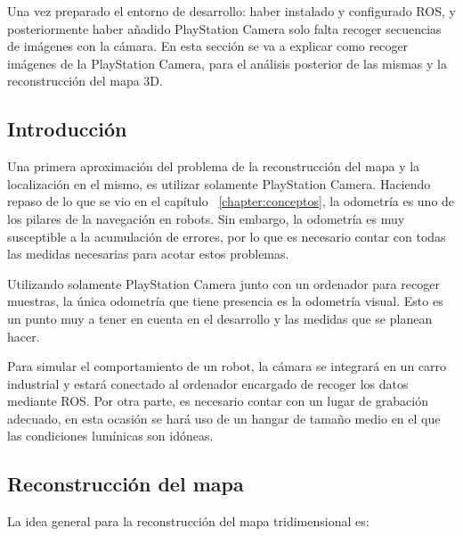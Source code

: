 

Una vez preparado el entorno de desarrollo: haber instalado y configurado ROS,
y posteriormente haber añadido PlayStation Camera solo falta recoger secuencias
de imágenes con la cámara. En esta sección se va a explicar como recoger
imágenes de la PlayStation Camera, para el análisis posterior de las mismas y
la reconstrucción del mapa 3D.

\subsection{Introducción}
Una primera aproximación del problema de la reconstrucción del mapa y la
localización en el mismo, es utilizar solamente PlayStation Camera. Haciendo
repaso de lo que se vio en el capítulo ~\ref{chapter:conceptos}, la odometría es
uno de los pilares de la navegación en robots. Sin embargo, la odometría es muy
susceptible a la acumulación de errores, por lo que es necesario contar con
todas las medidas necesarias para acotar estos problemas.

Utilizando solamente PlayStation Camera junto con un ordenador para recoger
muestras, la única odometría que tiene presencia es la odometría visual. Esto es
un punto muy a tener en cuenta en el desarrollo y las medidas que se planean
hacer.

Para simular el comportamiento de un robot, la cámara se integrará en un carro
industrial y estará conectado al ordenador encargado de recoger los datos
mediante ROS. Por otra parte, es necesario contar con un lugar de grabación
adecuado, en esta ocasión se hará uso de un hangar de tamaño medio en el que las
condiciones lumínicas son idóneas.

\subsection{Reconstrucción del mapa}
La idea general para la reconstrucción del mapa tridimensional es:

